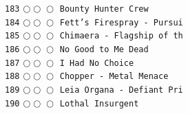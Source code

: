 \documentclass[a4paper,landscape]{article}
\begin{document}
\begin{multicols*}{5}
\texttt{183} \(\bigcirc\!\bigcirc\!\bigcirc\)  \texttt{Bounty Hunter Crew} \vspace{-0.3mm}\\ 
\texttt{184} \(\bigcirc\!\bigcirc\!\bigcirc\)  \texttt{Fett's Firespray - Pursui} \vspace{-0.3mm}\\ 
\texttt{185} \(\bigcirc\!\bigcirc\!\bigcirc\)  \texttt{Chimaera - Flagship of th} \vspace{-0.3mm}\\ 
\texttt{186} \(\bigcirc\!\bigcirc\!\bigcirc\)  \texttt{No Good to Me Dead} \vspace{-0.3mm}\\ 
\texttt{187} \(\bigcirc\!\bigcirc\!\bigcirc\)  \texttt{I Had No Choice} \vspace{-0.3mm}\\ 
\texttt{188} \(\bigcirc\!\bigcirc\!\bigcirc\)  \texttt{Chopper - Metal Menace} \vspace{-0.3mm}\\ 
\texttt{189} \(\bigcirc\!\bigcirc\!\bigcirc\)  \texttt{Leia Organa - Defiant Pri} \vspace{-0.3mm}\\ 
\texttt{190} \(\bigcirc\!\bigcirc\!\bigcirc\)  \texttt{Lothal Insurgent} \vspace{-0.3mm}\\ 

\end{multicols*}
\end{document}
